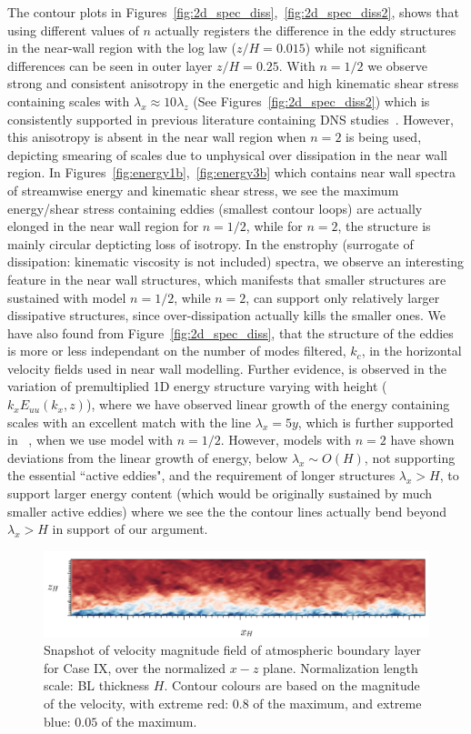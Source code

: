 The contour plots in Figures~\ref{fig:2d_spec_diss},~\ref{fig:2d_spec_diss2}, shows that using different values of $n$ actually registers the difference in the eddy structures in the near-wall region with the log law ($z/H = 0.015$) while not significant differences can be seen in outer layer $z/H = 0.25$. With $n = 1/2$ we observe strong and consistent anisotropy in the energetic and high kinematic shear stress containing scales with $\lambda_x \approx 10\lambda_z$ (See Figures~\ref{fig:2d_spec_diss2}) which is consistently supported in previous literature containing DNS studies~\cite{hoyas,jimrev}. However, this anisotropy is absent in the near wall region when $n = 2$ is being used, depicting smearing of scales due to unphysical over dissipation in the near wall region. In Figures~\ref{fig:energy1b},~\ref{fig:energy3b} which contains near wall spectra of streamwise energy and kinematic shear stress, we see the maximum energy/shear stress containing eddies (smallest contour loops) are actually elonged in the near wall region for $n = 1/2$, while for $n = 2$, the structure is mainly circular depticting loss of isotropy. In the enstrophy (surrogate of dissipation: kinematic viscosity is not included) spectra, we observe an interesting feature in the near wall structures, which manifests that smaller structures are sustained with model $n=1/2$, while $n = 2$, can support only relatively larger dissipative structures, since over-dissipation actually kills the smaller ones. We have also found from Figure~\ref{fig:2d_spec_diss}, that the structure of the eddies is more or less independant on the number of modes filtered, $k_c$, in the horizontal velocity fields used in near wall modelling. Further evidence, is observed in the variation of premultiplied 1D energy structure varying with height ($k_xE_{uu}(k_x,z)$), where we have observed linear growth of the energy containing scales with an excellent match with the line $\lambda_x = 5y$, which is further supported in ~\cite{jimrev}, when we use model with $n = 1/2$. However, models with $n = 2$ have shown deviations from the linear growth of energy, below $\lambda_x \sim O(H)$, not supporting the essential ``active eddies", and the requirement of longer structures $\lambda_x > H$, to support larger energy content (which would be originally sustained by much smaller active eddies) where we see the the contour lines actually bend beyond $\lambda_x > H$ in support of our argument.

\begin{figure}
\centering
\includegraphics[width = 0.95\linewidth]{Figure/ABL_1.png}
\caption[Snapshot of ABL]{Snapshot of velocity magnitude field of atmospheric boundary layer for Case IX, over the normalized $x-z$ plane. Normalization length scale: BL thickness $H$. Contour colours are based on the magnitude of the velocity, with extreme red: $0.8$ of the maximum, and  extreme blue: $0.05$ of the maximum.}
\end{figure}


